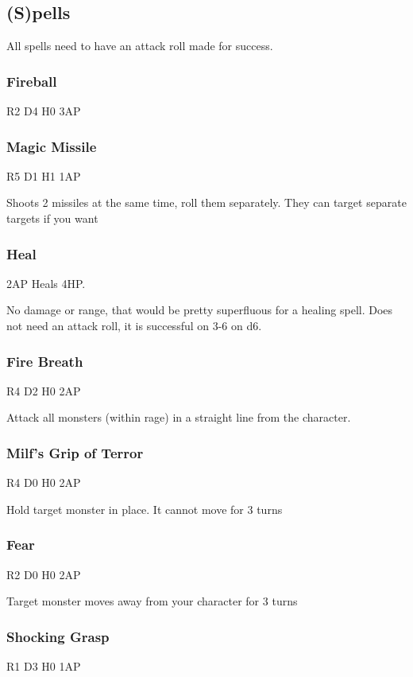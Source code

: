 \documentclass[a6paper,hidelinks]{article}
\begin{document}
\subsection{(S)pells}

All spells need to have an attack roll made for success.

\subsubsection{Fireball}
R2 D4 H0 3AP

\subsubsection{Magic Missile}
R5 D1 H1 1AP

Shoots 2 missiles at the same time, roll them separately. They can target separate targets if you want

\subsubsection{Heal}
2AP Heals 4HP.

No damage or range, that would be pretty superfluous for a healing spell. Does not need an attack roll, it is successful on 3-6 on d6.

\subsubsection{Fire Breath}
R4 D2 H0 2AP

Attack all monsters (within rage) in a straight line from the character.

\subsubsection{Milf's Grip of Terror}
R4 D0 H0 2AP

Hold target monster in place. It cannot move for 3 turns

\subsubsection{Fear}
R2 D0 H0 2AP

Target monster moves away from your character for 3 turns

\subsubsection{Shocking Grasp}
R1 D3 H0 1AP
\end{document}
